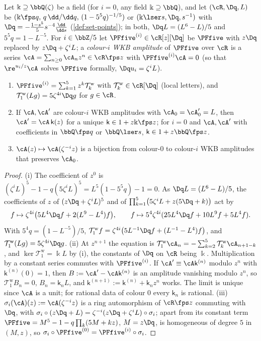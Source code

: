 \begin{lem}
\label{lem:gau-wkb}
Let $\Bbbk\supseteq\bbQ(\zeta)$ be a field (for $i=0$, any field $\Bbbk\supseteq\bbQ$), and let $(\cR,\Dq,L)$ be $(\Bbbk\fps q,\,q\,\dd/\dd q,\,(1-5^5q)^{-1/5})$ or $(\Bbbk\lser s,\Dq,s^{-1})$ with $\Dq=-\frac{1-s^5}5s^{-4}\frac{\dd}{\dd s}$ (\cref{def:set-points}); in both, $\Dq L=(L^6-L)/5$ and $5^5q=1-L^{-5}$. For $i\in\bbZ/5$ let $\PFfive^{(i)}\in\cR[z][\Dq]$ be $\PFfive$ with $z\Dq$ replaced by $z\Dq+\zeta^iL$; a \emph{colour-$i$ WKB amplitude} of $\PFfive$ over $\cR$ is a series $\cA=\sum_{n\geq0}\cA_nz^n\in\cR\fps z$ with $\PFfive^{(i)}\cA=0$ (so that $\re^{u_i/z}\cA$ solves $\PFfive$ formally, $\Dq u_i=\zeta^iL$).
\begin{enumerate}
\item $\PFfive^{(i)}=\sum_{k=1}^5z^k\mathcal T^{\mathrm w}_k$ with $\mathcal T^{\mathrm w}_k\in\cR[\Dq]$ (local letters), and $\mathcal T^{\mathrm w}_1(Lg)=5\zeta^{4i}\Dq g$ for $g\in\cR$.
\item If $\cA,\cA'$ are colour-$i$ WKB amplitudes with $\cA_0=\cA'_0=L$, then $\cA'=\cA\,\mathsf k(z)$ for a unique $\mathsf k\in1+z\Bbbk\fps z$; for $i=0$ and $\cA,\cA'$ with coefficients in $\bbQ\fps q$ or $\bbQ\lser s$, $\mathsf k\in1+z\bbQ\fps z$.
\item $\cA(z)\mapsto\cA(\zeta^{-i}z)$ is a bijection from colour-$0$ to colour-$i$ WKB amplitudes that preserves $\cA_0$.
\end{enumerate}
\end{lem}

\begin{proof}
(i) The coefficient of $z^0$ is $(\zeta^iL)^5-1-q(5\zeta^iL)^5=L^5(1-5^5q)-1=0$. As $\Dq L=(L^6-L)/5$, the coefficients of $z$ of $(z\Dq+\zeta^iL)^5$ and of $\prod_{k=1}^5\bigl(5\zeta^iL+z(5\Dq+k)\bigr)$ act by
\[
f\mapsto\zeta^{4i}\bigl(5L^4\Dq f+2(L^9-L^4)f\bigr),\qquad f\mapsto5^4\zeta^{4i}(25L^4\Dq f+10L^9f+5L^4f).
\]
With $5^4q=(1-L^{-5})/5$, $\mathcal T^{\mathrm w}_1f=\zeta^{4i}\bigl(5L^{-1}\Dq f+(L^{-1}-L^4)f\bigr)$, and $\mathcal T^{\mathrm w}_1(Lg)=5\zeta^{4i}\Dq g$.
(ii) At $z^{n+1}$ the equation is $\mathcal T^{\mathrm w}_1\cA_n=-\sum_{k=2}^5\mathcal T^{\mathrm w}_k\cA_{n+1-k}$, and $\ker\mathcal T^{\mathrm w}_1=\Bbbk L$ by (i), the constants of $\Dq$ on $\cR$ being $\Bbbk$. Multiplication by a constant series commutes with $\PFfive^{(i)}$. If $\cA'\equiv\cA\mathsf k^{(n)}$ modulo $z^n$ with $\mathsf k^{(n)}(0)=1$, then $B:=\cA'-\cA\mathsf k^{(n)}$ is an amplitude vanishing modulo $z^n$, so $\mathcal T^{\mathrm w}_1B_n=0$, $B_n=\mathsf k_nL$, and $\mathsf k^{(n+1)}:=\mathsf k^{(n)}+\mathsf k_nz^n$ works. The limit is unique since $\cA$ is a unit; for rational data of colour $0$ every $\mathsf k_n$ is rational.
(iii) $\sigma_i(\cA)(z):=\cA(\zeta^{-i}z)$ is a ring automorphism of $\cR\fps z$ commuting with $\Dq$, with $\sigma_i\circ(z\Dq+L)=\zeta^{-i}(z\Dq+\zeta^iL)\circ\sigma_i$; apart from its constant term $\PFfive=M^5-1-q\prod_k(5M+kz)$, $M=z\Dq$, is homogeneous of degree $5$ in $(M,z)$, so $\sigma_i\circ\PFfive^{(0)}=\PFfive^{(i)}\circ\sigma_i$.
\end{proof}

